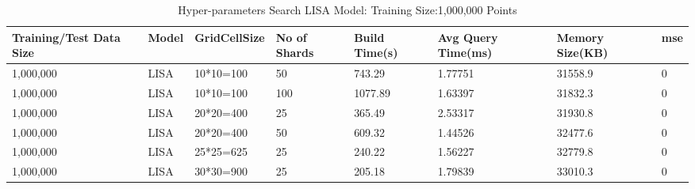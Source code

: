 \begin{table}
	\centering
\centering
	\begin{tabular}{||p{}<{\centering}|p{}<{\centering}|p{}<{\centering}| p{}<{\centering}|p{}<{\centering}|p{}<{\centering}|p{}<{\centering}|p{}<{\centering}||}
		\hline
		Training/Test Data Size& Model & GridCellSize & No of Shards& Build Time(s) & Avg Query Time(ms) & Memory Size(KB)&mse\\ [0.5ex] 
		\hline
		\hline
		1,000,000& LISA& 10*10=100 & 50&743.29&1.77751 & 31558.9&0\\
		\hline
		1,000,000& LISA& 10*10=100 & 100& 1077.89& 1.63397 & 31832.3&0\\
		\hline
		1,000,000& LISA& 20*20=400 & 25& 365.49& 2.53317 & 31930.8&0\\
		\hline
		1,000,000& LISA& 20*20=400 & 50& 609.32& 1.44526 & 32477.6&0\\
		\hline
		1,000,000& LISA& 25*25=625 & 25& 240.22& 1.56227& 32779.8&0\\
		\hline
		1,000,000& LISA& 30*30=900 & 25& 205.18& 1.79839 & 33010.3&0\\
		\hline
		\hline
	\end{tabular}
    \caption{Hyper-parameters Search LISA Model: Training Size:1,000,000 Points}
	\label{small_lognormal_lisa_1000000}
\end{table}

